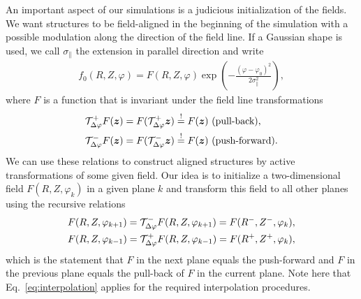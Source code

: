 An important aspect of our simulations is a judicious initialization of the
fields. We want structures to be field-aligned in the beginning of the simulation with
a possible modulation along the direction of the field line.
If a Gaussian shape is used, we call $\sigma_\parallel$ the extension in parallel
direction and write
\begin{align}
    f_0(R,Z,\varphi) = F(R,Z,\varphi) \exp\left( - \frac{(\varphi-\varphi_0)^2}{2\sigma_\parallel^2}\right),
    \label{eq:parallelInit}
\end{align}
where $F$ is a function that is invariant under the field line transformations
\begin{subequations}
\begin{align}
    \mathcal T^+_{\Delta\varphi} F({\boldsymbol{z}}) &= F( \mathcal T^+_{\Delta\varphi} {\boldsymbol{z}}) \overset{!}{=} F({\boldsymbol{z}}) \text{ (pull-back),} \\
    \mathcal T^-_{\Delta\varphi} F({\boldsymbol{z}}) &= F( \mathcal T^-_{\Delta\varphi} {\boldsymbol{z}}) \overset{!}{=} F({\boldsymbol{z}}) \text{ (push-forward).}
\end{align}
\label{}
\end{subequations}
We can use these relations to construct aligned structures
by active transformations of some given field.
Our idea is to initialize a two-dimensional field $F(R,Z, \varphi_k)$ in a given plane $k$ and
transform this field to all other planes using the recursive relations
\begin{subequations}
\begin{align}
    F( R, Z, \varphi_{k+1}) = \mathcal T^-_{\Delta\varphi} F( R, Z, \varphi_{k+1}) = F(R^-, Z^-, \varphi_k),\\
    F( R, Z, \varphi_{k-1}) = \mathcal T^+_{\Delta\varphi} F( R, Z, \varphi_{k-1}) = F(R^+, Z^+, \varphi_k),
\end{align}
    \label{eq:recursiveInit}
\end{subequations}
which is the statement that $F$ in the next plane equals the push-forward
and $F$ in the previous plane equals the pull-back of $F$ in the current plane.
Note here that Eq.~\eqref{eq:interpolation} applies for the required interpolation
procedures.




